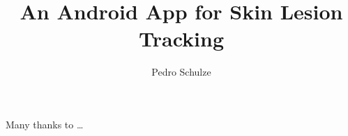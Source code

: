 \documentclass[bsc]{infthesis}
\title{An Android App for Skin Lesion Tracking}
\author{Pedro Schulze}
\begin{document}
\pagestyle{plain}
\begin{preliminary}

\maketitle

\begin{acknowledgements}
Many thanks to \ldots
\end{acknowledgements}

\standarddeclaration


\tableofcontents


\end{preliminary}








%

\begin{appendices}




\end{appendices}






\end{document}
